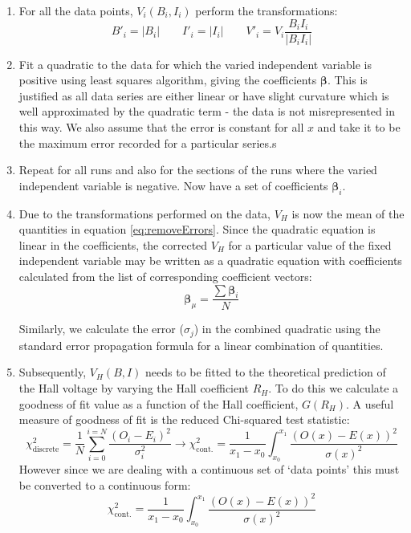 \documentclass{article}
\begin{document}
		\begin{enumerate}
			\item For all the data points, $V_i(B_i,I_i)$ perform the transformations:
			\[B'_i = |B_i| \qquad I'_i = |I_i| \qquad V'_i = V_i\frac{B_iI_i}{|B_iI_i|}\]
			
			\item Fit a quadratic to the data for which the varied independent variable is positive using least squares algorithm, giving the coefficients $\boldsymbol{\beta}$. This is justified as all data series are either linear or have slight curvature which is well approximated by the quadratic term - the data is not misrepresented in this way. We also assume that the error is constant for all $x$ and take it to be the maximum error recorded for a particular series.s
			
			\item Repeat for all runs and also for the sections of the runs where the varied independent variable is negative. Now have a set of coefficients $\boldsymbol{\beta}_i$.
			
			\item Due to the transformations performed on the data, $V_H$ is now the mean of the quantities in equation \ref{eq:removeErrors}. Since the quadratic equation is linear in the coefficients, the corrected $V_H$ for a particular value of the fixed independent variable may be written as a quadratic equation with coefficients calculated from the list of corresponding coefficient vectors:
			\[ \boldsymbol{\beta}_\mu = \frac{\sum\boldsymbol{\beta}_i}{N} \]
			
			\noindent Similarly, we calculate the error ($\sigma_j$) in the combined quadratic using the standard error propagation formula for a linear combination of quantities.
			
			\item Subsequently, $V_H(B,I)$ needs to be fitted to the theoretical prediction of the Hall voltage by varying the Hall coefficient $R_H$. To do this we calculate a goodness of fit value as a function of the Hall coefficient, $G(R_H)$. A useful measure of goodness of fit is the reduced Chi-squared test statistic:
			\begin{equation}
				\chi^2_{\textrm{discrete}} = \frac{1}{N}\sum_{i=0}^{i=N}\frac{(O_i-E_i)^2}{\sigma_i^2} \rightarrow \chi^2_{\textrm{cont.}} = \frac{1}{x_1-x_0}\int_{x_0}^{x_1}\frac{(O(x)-E(x))^2}{\sigma(x)^2}
			\end{equation}
			\noindent However since we are dealing with a continuous set of `data points' this must be converted to a continuous form:
			\begin{equation}
				\chi^2_{\textrm{cont.}} = \frac{1}{x_1-x_0}\int_{x_0}^{x_1}\frac{(O(x)-E(x))^2}{\sigma(x)^2}
			\end{equation}
			

\end{enumerate}
\end{document}
